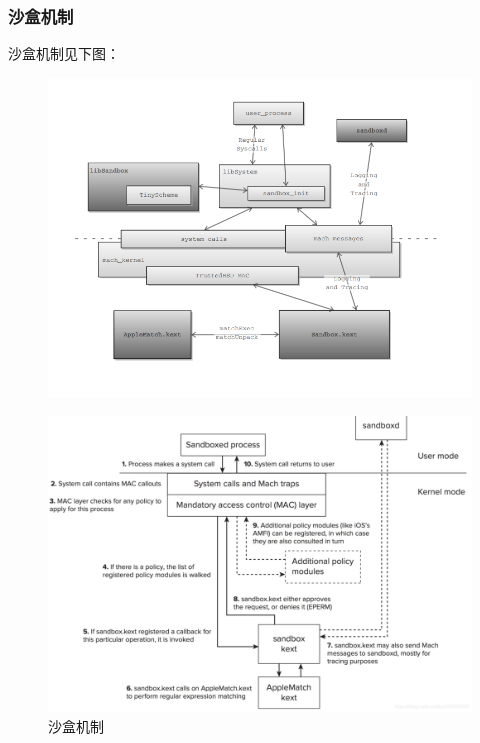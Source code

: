 \documentclass[AutoFakeBold,a4paper]{ctexart}
\begin{document}
\subsubsection{沙盒机制}

沙盒机制见下图：

\begin{figure}[H]
    \centering
    \includegraphics[width=0.92\columnwidth]{../ChenSirui/MacOS Sandbox/Sandbox_Structure.PNG}
\end{figure}

\begin{figure}[H]
    \centering
    \includegraphics[width=0.92\columnwidth]{../ChenSirui/MacOS Sandbox/Sandbox_Process.png}
    \caption{沙盒机制\cite{blazakis2011apple}}
\end{figure}
\end{document}
